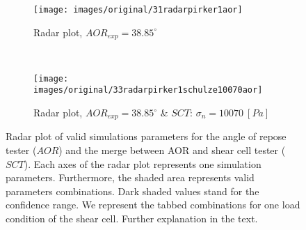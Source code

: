 \begin{figure}[htp] \centering
    \begin{subfigure}[b]{0.96\columnwidth}
        \texttt{[image: images/original/31radarpirker1aor]}
        \caption{Radar plot, $AOR_{exp} = 38.85 ^\circ$}
        \label{fig:31radarpirker1aor} 
    \end{subfigure}\\
        \begin{subfigure}[b]{0.96\columnwidth}
        \texttt{[image: images/original/33radarpirker1schulze10070aor]}
        \caption{Radar plot, $AOR_{exp} = 38.85
        ^\circ$ \& $SCT$: $\sigma_n=10070 ~[Pa]$}
        \label{fig:33radarpirker1schulze10070aor} 
    \end{subfigure}
    \caption[Radar plot of valid simulations parameters for the AOR and
    the merge between AOR and SCT valid parameters]{Radar plot of valid
    simulations parameters for the angle of repose tester ($AOR$) and the merge
    between AOR and shear cell tester ($SCT$).
    Each axes of the radar plot represents one simulation parameters.
    Furthermore, the shaded area represents valid parameters combinations.
    Dark shaded values stand for the confidence range.
    We represent the tabbed combinations for one load condition of the shear cell. 
    Further explanation in the text. }
    \label{fig:35schulze10070aorradarandcloud}
\end{figure}


